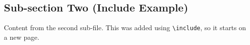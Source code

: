 \subsection*{Sub-section Two (Include Example)}
Content from the second sub-file. This was added using \texttt{\textbackslash include}, so it starts on a new page.


